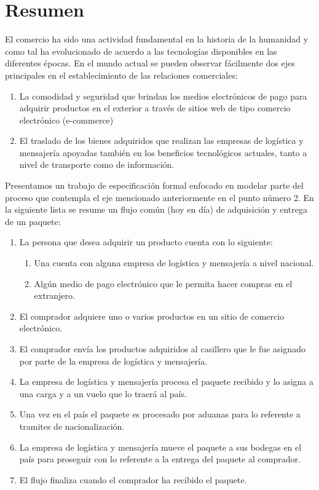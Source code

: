 \documentclass[12pt,a4paper]{article}
\begin{document}
\section{Resumen}
El comercio ha sido una actividad fundamental en la historia de la humanidad y como tal ha evolucionado de acuerdo a las tecnologías disponibles en las diferentes épocas. 
En el mundo actual se pueden observar fácilmente dos ejes principales en el establecimiento de las relaciones comerciales: 
\begin{enumerate}
\item La comodidad y seguridad que brindan los medios electrónicos de pago para adquirir productos en el exterior a través de sitios web de tipo comercio electrónico (e-commerce)
\item El traslado de los bienes adquiridos que realizan las empresas de logística y mensajería apoyadas también en los beneficios tecnológicos actuales, tanto a nivel de transporte como de información.
\end{enumerate}
Presentamos un trabajo de especificación formal enfocado en modelar parte del proceso que contempla el eje mencionado anteriormente en el punto número 2. En la siguiente lista se resume un flujo común (hoy en día) de adquisición y entrega de un paquete:
\begin{enumerate}
\item La persona que desea adquirir un producto cuenta con lo siguiente:
\begin{enumerate}
\item Una cuenta con alguna empresa de logística y mensajería a nivel nacional.
\item Algún medio de pago electrónico que le permita hacer compras en el extranjero.
\end{enumerate}
\item El comprador adquiere uno o varios productos en un sitio de comercio electrónico.
\item El comprador envía los productos adquiridos al casillero que le fue asignado por parte de la empresa de logística y mensajería.
\item La empresa de logística y mensajería procesa el paquete recibido y lo asigna a una carga y a un vuelo que lo traerá al país.
\item Una vez en el país el paquete es procesado por aduanas para lo referente a tramites de nacionalización.
\item La empresa de logística y mensajería mueve el paquete a sus bodegas en el país para proseguir con lo referente a la entrega del paquete al comprador.
\item El flujo finaliza cuando el comprador ha recibido el paquete.
\end{enumerate}
\end{document}
